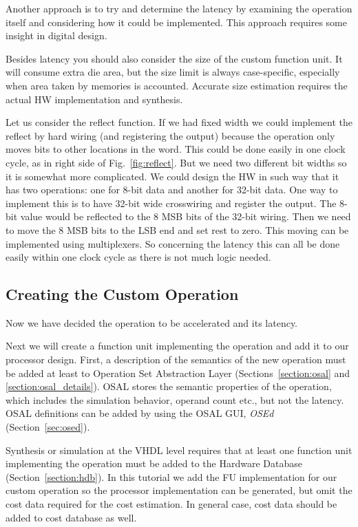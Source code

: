\documentclass[twoside]{tceusermanual}
\begin{document}
Another approach is to try and determine the latency by examining the
operation itself and considering how it could be implemented. This
approach requires some insight in digital design.

Besides latency you should also consider the size of the custom
function unit.  It will consume extra die area, but the size limit is
always case-specific, especially when area taken by memories is
accounted. Accurate size estimation requires the actual HW
implementation and synthesis.

Let us consider the reflect function. If we had fixed width we could
implement the reflect by hard wiring (and registering the output)
because the operation only moves bits to other locations in the
word. This could be done easily in one clock cycle, as in right side
of Fig.~\ref{fig:reflect}. But we need two different bit widths so it
is somewhat more complicated. We could design the HW in such way that
it has two operations: one for 8-bit data and another for 32-bit
data. One way to implement this is to have 32-bit wide crosswiring and
register the output. The 8-bit value would be reflected to the 8 MSB
bits of the 32-bit wiring. Then we need to move the 8 MSB bits to the
LSB end and set rest to zero. This moving can be implemented using
multiplexers. So concerning the latency this can all be done easily
within one clock cycle as there is not much logic needed.




\subsection{Creating the Custom Operation}
\label{section:customOperations}

Now we have decided the operation to be accelerated and its
latency.


Next we will create a function unit implementing the
operation and add it to our processor design. First, a description of
the semantics of the new operation must be added at least to Operation
Set Abstraction Layer (Sections~\ref{section:osal} and
\ref{section:osal_details}). OSAL stores the semantic properties of
the operation, which includes the simulation behavior, operand count
etc., but not the latency. OSAL definitions can be added by using the
OSAL GUI, \emph{OSEd} (Section~\ref{sec:osed}).

Synthesis or simulation at the VHDL level requires that at least one
function unit implementing the operation must be added to the Hardware
Database (Section~\ref{section:hdb}).  In this tutorial we add the FU
implementation for our custom operation so the processor
implementation can be generated, but omit the cost data required for
the cost estimation. In general case, cost data should be added to
cost database as well.
\end{document}
